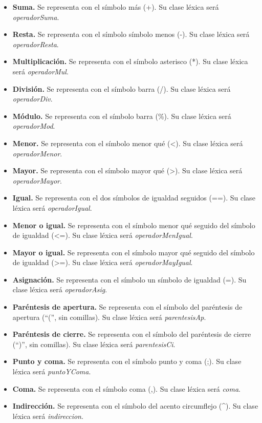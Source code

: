 \begin{itemize}
    \item \textbf{Suma.} Se representa con el símbolo más (+). Su clase léxica será \textit{operadorSuma}.
    \item \textbf{Resta.} Se representa con el símbolo símbolo menos (-). Su clase léxica será \textit{operadorResta}.
    \item \textbf{Multiplicación.} Se representa con el símbolo asterisco (*). Su clase léxica será \textit{operadorMul}.
    \item \textbf{División.} Se representa con el símbolo barra (/). Su clase léxica será \textit{operadorDiv}.
    \item \textbf{Módulo.} Se representa con el símbolo barra (\%). Su clase léxica será \textit{operadorMod}.
    \item \textbf{Menor.} Se representa con el símbolo menor qué (<). Su clase léxica será \textit{operadorMenor}.
    \item \textbf{Mayor.} Se representa con el símbolo mayor qué (>). Su clase léxica será \textit{operadorMayor}.
    \item \textbf{Igual.} Se representa con el dos símbolos de igualdad seguidos (==). Su clase léxica será \textit{operadorIgual}.
    \item \textbf{Menor o igual.} Se representa con el símbolo menor qué seguido del símbolo de igualdad (<=). Su clase léxica será \textit{operadorMenIgual}.
    \item \textbf{Mayor o igual.} Se representa con el símbolo mayor qué seguido del símbolo de igualdad (>=). Su clase léxica será \textit{operadorMayIgual}.
    \item \textbf{Asignación.} Se representa con el símbolo un símbolo de igualdad (=). Su clase léxica será \textit{operadorAsig}.
    \item \textbf{Paréntesis de apertura.} Se representa con el símbolo del paréntesis de apertura (``('', sin comillas). Su clase léxica será \textit{parentesisAp}.
    \item \textbf{Paréntesis de cierre.} Se representa con el símbolo del paréntesis de cierre (``)'', sin comillas). Su clase léxica será \textit{parentesisCi}.
    \item \textbf{Punto y coma.} Se representa con el símbolo punto y coma (;). Su clase léxica será \textit{puntoYComa}.
    \item \textbf{Coma.} Se representa con el símbolo coma (,). Su clase léxica será \textit{coma}.
    \item \textbf{Indirección.} Se representa con el símbolo del acento circumflejo (\^{}). Su clase léxica será \textit{indireccion}.

\end{itemize}

